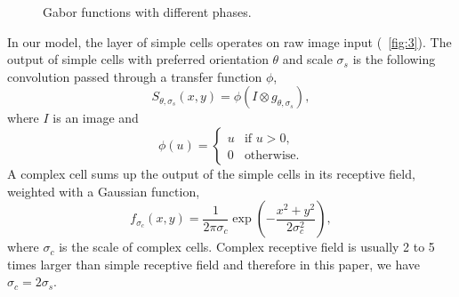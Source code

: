 \documentclass[conference]{IEEEtran}
\begin{document}
\begin{figure}[htp]
\centering
{}\hfil
{}
\caption{Gabor functions with different phases.}
\label{fig:4}
\end{figure}

In our model, the layer of simple cells operates on raw image input
(\figurename~\ref{fig:3}). 
The output of simple cells with preferred orientation $\theta$
and scale $\sigma_s$ is the following convolution
passed through a transfer function $\phi$,
\begin{equation}\label{equ:gabor}
S_{\theta,\sigma_s}(x,y)=\phi(I\otimes g_{\theta,\sigma_s}),
\end{equation}
where $I$ is an image and 
\begin{equation}\label{equ:gabor}
\phi(u)=\left\{\begin{array}{ll}
u & \text{if } u>0,\\
0 & \text{otherwise.}
\end{array}\right.
\end{equation}
A complex cell sums up the output of the simple cells in its receptive field, 
weighted with a Gaussian function,
\begin{equation}
f_{\sigma_c}(x,y)=\frac{1}{2\pi\sigma_c}\exp\left(-\frac{x^2+y^2}{2\sigma_c^2}\right),
\end{equation}
where $\sigma_c$ is the scale of complex cells.
Complex receptive field is usually 2 to 5 times larger than simple receptive field \cite{movshon1978}
and therefore in this paper, we have $\sigma_c=2\sigma_s$.
\end{document}
